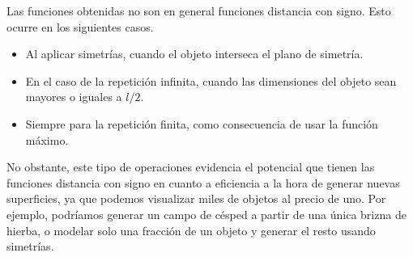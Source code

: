 Las funciones obtenidas no son en general funciones distancia con signo. Esto ocurre en los siguientes casos.
\begin{itemize}
    \item Al aplicar simetrías, cuando el objeto interseca el plano de simetría.
    \item En el caso de la repetición infinita, cuando las dimensiones del objeto sean mayores o iguales a $l/2$.
    \item Siempre para la repetición finita, como consecuencia de usar la función máximo. 
\end{itemize}

No obstante, este tipo de operaciones evidencia el potencial que tienen las funciones distancia con signo en cuanto a eficiencia a la hora de generar nuevas superficies, ya que podemos visualizar miles de objetos al precio de uno. Por ejemplo, podríamos generar un campo de césped a partir de una única brizna de hierba, o modelar solo una fracción de un objeto y generar el resto usando simetrías.

